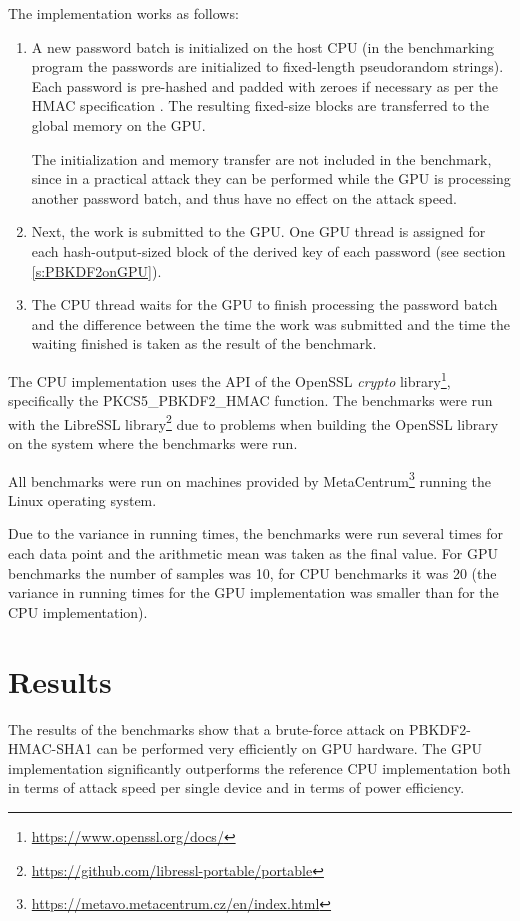 \documentclass[12pt,oneside]{fithesis2}
\begin{document}
      The implementation works as follows:
      \begin{enumerate}
        \item A new password batch is initialized on the host CPU (in the benchmarking program the passwords are initialized to fixed-length pseudorandom strings). Each password is pre-hashed and padded with zeroes if necessary as per the HMAC specification \cite{rfc2104}. The resulting fixed-size blocks are transferred to the global memory on the GPU.
        
              The initialization and memory transfer are not included in the benchmark, since in a practical attack they can be performed while the GPU is processing another password batch, and thus have no effect on the attack speed.
        \item Next, the work is submitted to the GPU. One GPU thread is assigned for each hash-output-sized block of the derived key of each password (see section \ref{s:PBKDF2onGPU}).
        \item The CPU thread waits for the GPU to finish processing the password batch and the difference between the time the work was submitted and the time the waiting finished is taken as the result of the benchmark.
      \end{enumerate}
      
      The CPU implementation uses the API of the OpenSSL \emph{crypto} library\footnote{\url{https://www.openssl.org/docs/}}, specifically the PKCS5\_PBKDF2\_HMAC function. The benchmarks were run with the LibreSSL library\footnote{\url{https://github.com/libressl-portable/portable}} due to problems when building the OpenSSL library on the system where the benchmarks were run.
      
      All benchmarks were run on machines provided by MetaCentrum\footnote{\url{https://metavo.metacentrum.cz/en/index.html}} running the Linux operating system.
      
      Due to the variance in running times, the benchmarks were run several times for each data point and the arithmetic mean was taken as the final value. For GPU benchmarks the number of samples was 10, for CPU benchmarks it was 20 (the variance in running times for the GPU implementation was smaller than for the CPU implementation).
      
      \section{Results} \label{s:results}
      The results of the benchmarks show that a brute-force attack on PBKDF2-HMAC-SHA1 can be performed very efficiently on GPU hardware. The GPU implementation significantly outperforms the reference CPU implementation both in terms of attack speed per single device and in terms of power efficiency.
      
\end{document}

